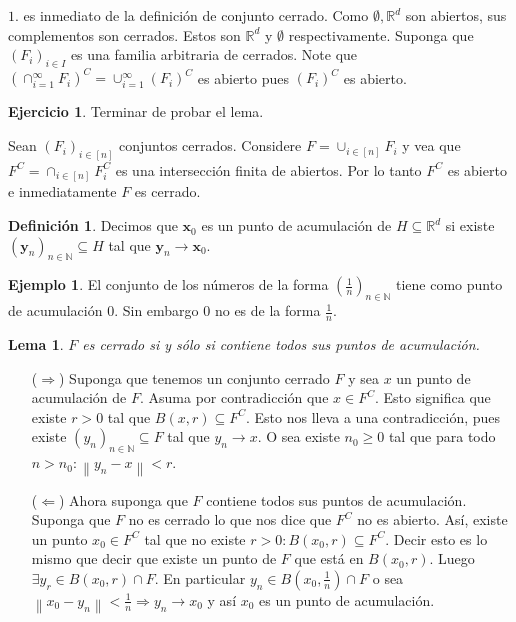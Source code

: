 \documentclass[12pt]{article}
\theoremstyle{plain}
\newtheorem{Lem}[Th]{Lema}             %
\theoremstyle{definition}
\newtheorem{Def}[Th]{Definición}       %
\newtheorem{Ex}[Th]{Ejemplo}               %
\newtheorem{Ej}[Th]{Ejercicio}
\theoremstyle{remark}
\numberwithin{equation}{section}
\newcommand{\bN}{\mathbb{N}}        %
\newcommand{\bR}{\mathbb{R}}        %
\renewcommand{\geq}{\geqslant}      %
\renewcommand{\:}{\colon}           %
\renewcommand{\vec}[1]{\mathbf{#1}}
\newcommand{\vx}{\vec{x}}           %
\newcommand{\vy}{\vec{y}}
\newcommand{\bonj}[1]{\left\lbrack#1\right\rbrack}
\newcommand{\nm}[1]{\left\|#1\right\|} %
\begin{document}
\begin{multicols}{2}
\begin{ptcbp}
$\mathit{1}.$ es inmediato de la definición de conjunto cerrado. Como $\emptyset,\bR^d$ son abiertos, sus complementos son cerrados. Estos son $\bR^d$ y $\emptyset$ respectivamente.
Suponga que $(F_i)_{i\in I}$ es una familia arbitraria de cerrados. Note que $\left(\cap_{i=1}^\infty F_i\right)^C=\displaystyle\cup_{i=1}^\infty (F_i)^C$ es abierto pues $(F_i)^C$ es abierto.
\end{ptcbp}

\begin{Ej}
  Terminar de probar el lema.
\end{Ej}

\begin{ptcb}
Sean $(F_i)_{i\in\bonj{n}}$ conjuntos cerrados. Considere $F=\cup_{i\in\bonj{n}}F_i$ y vea que $F^C=\cap_{i\in\bonj{n}}F_i^C$ es una intersección finita de abiertos. Por lo tanto $F^C$ es abierto e inmediatamente $F$ es cerrado.
\end{ptcb}

\begin{Def}
Decimos que $\vx_0$ es un punto de acumulación de $H\subseteq \bR^d$ si existe $(\vy_n)_{n\in\bN}\subseteq H$ tal que $\vy_n\to \vx_0$.
\end{Def}

\begin{Ex}
  El conjunto de los números de la forma $\left(\frac{1}{n}\right)_{n\in\bN}$ tiene como punto de acumulación $0$. Sin embargo $0$ no es de la forma $\frac{1}{n}$.
\end{Ex}


\begin{Lem}
  $F$ es cerrado si y sólo si contiene todos sus puntos de acumulación.
\end{Lem}
\begin{ptcbp}
\begin{enumerate}
  \item[($\Rightarrow$)] Suponga que tenemos un conjunto cerrado $F$ y sea $x$ un punto de acumulación de $F$. Asuma por contradicción que $x\in F^C$. Esto significa que existe $r>0$ tal que $B(x,r)\subseteq F^C$. Esto nos lleva a una contradicción, pues existe $(y_n)_{n\in\bN}\subseteq F$ tal que $y_n\to x$. O sea existe $n_0\geq 0$ tal que para todo $n>n_0: \nm{y_n-x}< r$.\par
  \item[($\Leftarrow$)] Ahora suponga que $F$ contiene todos sus puntos de acumulación. Suponga que $F$ no es cerrado lo que nos dice que $F^C$ no es abierto. Así, existe un punto $x_0\in F^C$ tal que no existe $r>0: B(x_0,r)\subseteq F^C$. Decir esto es lo mismo que decir que existe un punto de $F$ que está en $B(x_0,r)$. Luego $\exists y_r\in B(x_0,r)\cap F$. En particular $y_n\in B(x_0,\frac{1}{n})\cap F$ o sea $\nm{x_0-y_n}<\frac{1}{n}\Rightarrow y_n\to x_0$ y así $x_0$ es un punto de acumulación.
\end{enumerate}




\end{ptcbp}
\end{multicols}
\end{document}
